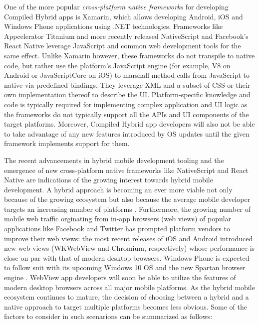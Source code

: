 \documentclass[thesis.tex]{subfiles}
\begin{document}
One of the more popular \textit{cross-platform native frameworks} for developing Compiled Hybrid apps is Xamarin, which allows developing Android, iOS and Windows Phone applications using .NET technologies. Frameworks like Appcelerator Titanium and more recently released NativeScript and Facebook's React Native leverage JavaScript and common web development tools for the same effect. Unlike Xamarin however, these frameworks do not transpile to native code, but rather use the platform's JavaScript engine (for example, V8 on Android or JavaScriptCore on iOS) to marshall method calls from JavaScript to native via predefined bindings. They leverage XML and a subset of CSS or their own implementation thereof to describe the UI. Platform-specific knowledge and code is typically required for implementing complex application and UI logic as the frameworks do not typically support all the APIs and UI components of the target platforms. Moreover, Compiled Hybrid app developers will also not be able to take advantage of any new features introduced by OS updates until the given framework implements support for them.

The recent advancements in hybrid mobile development tooling and the emergence of new cross-platform native frameworks like NativeScript and React Native are indications of the growing interest towards hybrid mobile development. A hybrid approach is becoming an ever more viable not only because of the growing ecosystem but also because the average mobile developer targets an increasing number of platforms \cite{two_platforms}. Furthermore, the growing number of mobile web traffic orginating from in-app browsers (web views) of popular applications like Facebook and Twitter has prompted platform vendors to improve their web views: the most recent releases of iOS and Android introduced new web views (WKWebView and Chromium, respectively) whose performance is close on par with that of modern desktop browsers. \cite{souders_webview} Windows Phone is expected to follow suit with its upcoming Windows 10 OS and the new Spartan browser engine \cite{spartan}. WebView app developers will soon be able to utilize the features of modern desktop browsers across all major mobile platforms. As the hybrid mobile ecosystem continues to mature, the decision of choosing between a hybrid and a native approach to target multiple platforms becomes less obvious. Some of the factors to consider in such scenarions can be summarized as follows:
\end{document}
